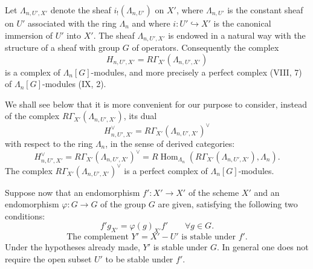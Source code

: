 \documentclass[11pt]{article}
\DeclareMathOperator{\Hom}{Hom}
\providecommand{\Hom}{\operatorname{Hom}}
\providecommand{\La}{\Lambda}
\providecommand{\Hom}{\operatorname{Hom}}
\begin{document}
Let $\La_{n,U',X'}$ denote the sheaf $i_!(\La_{n,U'})$ on $X'$, where $\La_{n,U'}$ is the constant sheaf on $U'$ associated with the ring $\La_n$ and where $i:U'\hookrightarrow X'$ is the canonical immersion of $U'$ into $X'$. The sheaf $\La_{n,U',X'}$ is endowed in a natural way with the structure of a sheaf with group $G$ of operators. Consequently the complex
\[
H_{n,U',X'}=R\Gamma_{X'}(\La_{n,U',X'})
\]
is a complex of $\La_n[G]$-modules, and more precisely a perfect complex (VIII, 7) of $\La_n[G]$-modules (IX, 2).

We shall see below that it is more convenient for our purpose to consider, instead of the complex $R\Gamma_{X'}(\La_{n,U',X'})$, its dual
\[
H_{n,U',X'}^\vee=R\Gamma_{X'}(\La_{n,U',X'})^\vee
\]
with respect to the ring $\La_n$, in the sense of derived categories:
\[
H_{n,U',X'}^\vee
=R\Gamma_{X'}(\La_{n,U',X'})^\vee
=R\Hom_{\La_n}(R\Gamma_{X'}(\La_{n,U',X'}),\La_n).
\]
The complex $R\Gamma_{X'}(\La_{n,U',X'})^\vee$ is a perfect complex of $\La_n[G]$-modules.

Suppose now that an endomorphism $f':X'\to X'$ of the scheme $X'$ and an endomorphism $\varphi:G\to G$ of the group $G$ are given, satisfying the following two conditions:
\begin{equation}\tag{1.1}\label{sga5:XII:equation:1.1}
f'g_{X'}=\varphi(g)_{X'}f'\qquad \forall g\in G .
\end{equation}
\begin{equation}\tag{1.2}\label{sga5:XII:equation:1.2}
\text{The complement }Y'=X'-U'\text{ is stable under }f'.
\end{equation}
Under the hypotheses already made, $Y'$ is stable under $G$. In general one does not require the open subset $U'$ to be stable under $f'$.
\end{document}
